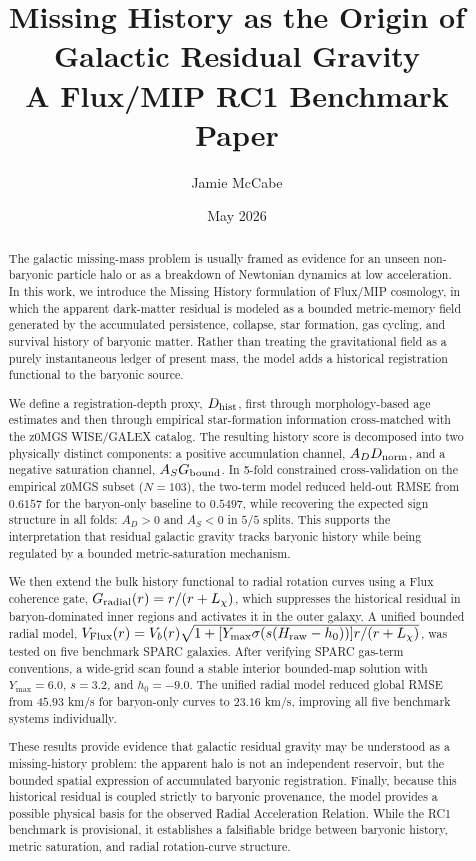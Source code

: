 \documentclass[11pt]{article}
\title{Missing History as the Origin of Galactic Residual Gravity\\A Flux/MIP RC1 Benchmark Paper}
\author{Jamie McCabe}
\date{May 2026}
\begin{document}
\maketitle
\begin{abstract}
The galactic missing-mass problem is usually framed as evidence for an unseen non-baryonic particle halo or as a breakdown of Newtonian dynamics at low acceleration. In this work, we introduce the Missing History formulation of Flux/MIP cosmology, in which the apparent dark-matter residual is modeled as a bounded metric-memory field generated by the accumulated persistence, collapse, star formation, gas cycling, and survival history of baryonic matter. Rather than treating the gravitational field as a purely instantaneous ledger of present mass, the model adds a historical registration functional to the baryonic source.

We define a registration-depth proxy, $D_{\rm hist}$, first through morphology-based age estimates and then through empirical star-formation information cross-matched with the z0MGS WISE/GALEX catalog. The resulting history score is decomposed into two physically distinct components: a positive accumulation channel, $A_DD_{\rm norm}$, and a negative saturation channel, $A_SG_{\rm bound}$. In 5-fold constrained cross-validation on the empirical z0MGS subset ($N=103$), the two-term model reduced held-out RMSE from $0.6157$ for the baryon-only baseline to $0.5497$, while recovering the expected sign structure in all folds: $A_D>0$ and $A_S<0$ in $5/5$ splits. This supports the interpretation that residual galactic gravity tracks baryonic history while being regulated by a bounded metric-saturation mechanism.

We then extend the bulk history functional to radial rotation curves using a Flux coherence gate, $G_{\rm radial}(r)=r/(r+L_\chi)$, which suppresses the historical residual in baryon-dominated inner regions and activates it in the outer galaxy. A unified bounded radial model, $V_{\rm Flux}(r)=V_b(r)\sqrt{1+[Y_{\max}\sigma(s(H_{\rm raw}-h_0))]r/(r+L_\chi)}$, was tested on five benchmark SPARC galaxies. After verifying SPARC gas-term conventions, a wide-grid scan found a stable interior bounded-map solution with $Y_{\max}=6.0$, $s=3.2$, and $h_0=-9.0$. The unified radial model reduced global RMSE from $45.93$ km/s for baryon-only curves to $23.16$ km/s, improving all five benchmark systems individually.

These results provide evidence that galactic residual gravity may be understood as a missing-history problem: the apparent halo is not an independent reservoir, but the bounded spatial expression of accumulated baryonic registration. Finally, because this historical residual is coupled strictly to baryonic provenance, the model provides a possible physical basis for the observed Radial Acceleration Relation. While the RC1 benchmark is provisional, it establishes a falsifiable bridge between baryonic history, metric saturation, and radial rotation-curve structure.
\end{abstract}
\end{document}

